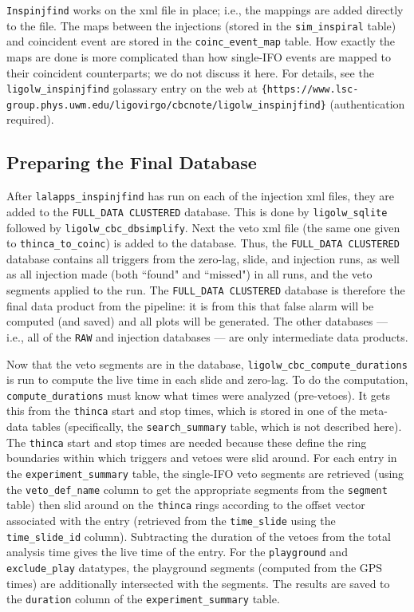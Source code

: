 \verb|Inspinjfind| works on the xml file in place; i.e., the mappings are added directly to the file. The maps between the injections (stored in the \verb|sim_inspiral| table) and coincident event are stored in the \verb|coinc_event_map| table. How exactly the maps are done is more complicated than how single-\ac{IFO} events are mapped to their coincident counterparts; we do not discuss it here. For details, see the \verb|ligolw_inspinjfind| golassary entry on the web at \verb|{https://www.lsc-group.phys.uwm.edu/ligovirgo/cbcnote/ligolw_inspinjfind}| (authentication required).

\subsection{Preparing the Final Database}

After \verb|lalapps_inspinjfind| has run on each of the injection xml files, they are added to the \verb|FULL_DATA CLUSTERED| database. This is done by \verb|ligolw_sqlite| followed by \verb|ligolw_cbc_dbsimplify|. Next the veto xml file (the same one given to \verb|thinca_to_coinc|) is added to the database. Thus, the \verb|FULL_DATA CLUSTERED| database contains all triggers from the zero-lag, slide, and injection runs, as well as all injection made (both ``found" and ``missed") in all runs, and the veto segments applied to the run. The \verb|FULL_DATA CLUSTERED| database is therefore the final data product from the pipeline: it is from this that false alarm will be computed (and saved) and all plots will be generated. The other databases --- i.e., all of the \verb|RAW| and injection databases --- are only intermediate data products.

Now that the veto segments are in the database, \verb|ligolw_cbc_compute_durations| is run to compute the live time in each slide and zero-lag. To do the computation, \verb|compute_durations| must know what times were analyzed (pre-vetoes). It gets this from the \verb|thinca| start and stop times, which is stored in one of the meta-data tables (specifically, the \verb|search_summary| table, which is not described here). The \verb|thinca| start and stop times are needed because these define the ring boundaries within which triggers and vetoes were slid around. For each entry in the \verb|experiment_summary| table, the single-\ac{IFO} veto segments are retrieved (using the \verb|veto_def_name| column to get the appropriate segments from the \verb|segment| table) then slid around on the \verb|thinca| rings according to the offset vector associated with the entry (retrieved from the \verb|time_slide| using the \verb|time_slide_id| column). Subtracting the duration of the vetoes from the total analysis time gives the live time of the entry. For the \verb|playground| and \verb|exclude_play| datatypes, the playground segments (computed from the GPS times) are additionally intersected with the segments. The results are saved to the \verb|duration| column of the \verb|experiment_summary| table.

